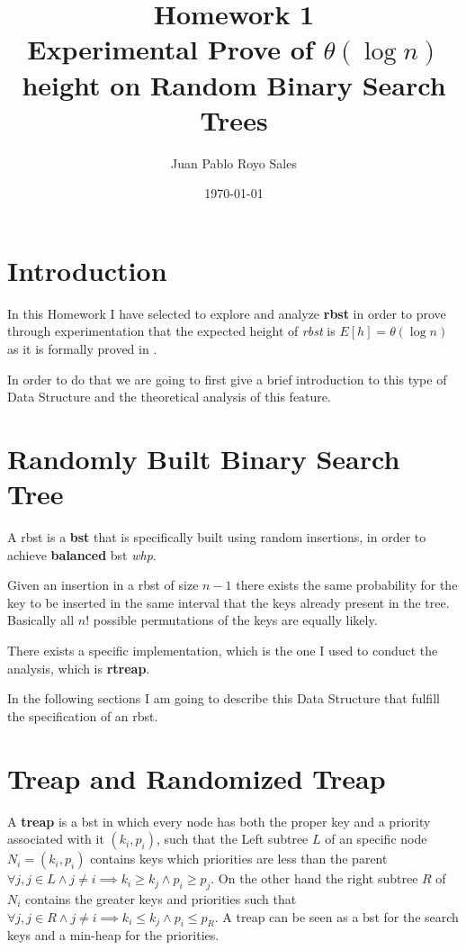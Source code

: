 \documentclass[12pt, a4paper]{article}
\title{%
      Homework 1 \\
      Experimental Prove of $\theta(\log n)$ height on Random Binary Search Trees
}
\author{Juan Pablo Royo Sales}
\date\today
\begin{document}
\maketitle

\section{Introduction}
In this Homework I have selected to explore and analyze \textbf{\acrfull{rbst}} in order to prove through experimentation that the expected height of \textit{\acrshort{rbst}} is $E[h] = \theta(\log n)$ as it is formally proved in \cite{cormen}.

In order to do that we are going to first give a brief introduction to this type of Data Structure and the theoretical analysis of this feature.

\section{Randomly Built Binary Search Tree}
A \acrshort{rbst} is a \textbf{\acrfull{bst}} that is specifically built using random insertions, in order to achieve \textbf{balanced} \acrshort{bst} \textit{whp}.

Given an insertion in a \acrshort{rbst} of size $n - 1$ there exists the same probability for the key to be inserted in the same interval that the keys already present in the tree. Basically all $n{!}$ possible permutations of the keys are equally likely.

There exists a specific implementation, which is the one I used to conduct the analysis, which is \textbf{\acrfull{rtreap}}.

In the following sections I am going to describe this Data Structure that fulfill the specification of an \acrshort{rbst}.

\section{Treap and Randomized Treap}
A \textbf{\acrfull{treap}} is a \acrshort{bst} in which every node has both the proper key and a priority associated with it $(k_i, p_i)$, such that the Left subtree $L$ of an specific node $N_i = (k_i, p_i)$ contains keys which priorities are less than the parent $\forall j, j \in L \land j \neq i \implies k_i \geq k_j \land p_i \geq p_j$. On the other hand the right subtree $R$ of $N_i$ contains the greater keys and priorities such that $\forall j, j \in R \land j \neq i \implies k_i \leq k_j \land p_i \leq p_R$. A \acrshort{treap} can be seen as a \acrshort{bst} for the search keys and a min-heap for the priorities.
\end{document}
